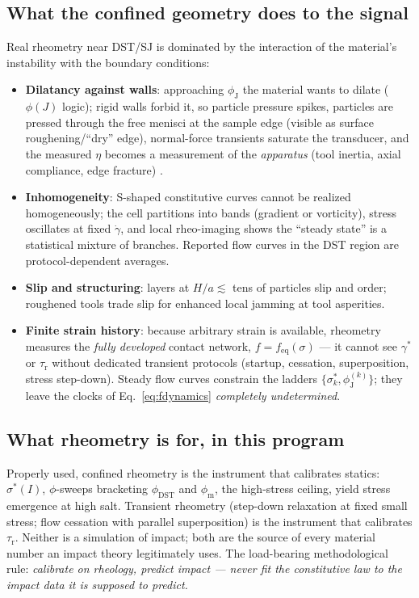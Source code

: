 \documentclass[11pt]{article}
\newcommand{\phiJ}{\phi_{\mathrm{J}}}
\newcommand{\phiM}{\phi_{\mathrm{m}}}
\newcommand{\sigmastar}{\sigma^{*}}
\newcommand{\gdot}{\dot{\gamma}}
\begin{document}
\subsection{What the confined geometry does to the signal}
Real rheometry near DST/SJ is dominated by the interaction of the material's instability with the boundary conditions:
\begin{itemize}
\item \textbf{Dilatancy against walls}: approaching $\phiJ$ the material wants to dilate ($\phi(J)$ logic); rigid walls forbid it, so particle pressure spikes, particles are pressed through the free menisci at the sample edge (visible as surface roughening/``dry'' edge), normal-force transients saturate the transducer, and the measured $\eta$ becomes a measurement of the \emph{apparatus} (tool inertia, axial compliance, edge fracture) \cite{brown2014,hermes2016}.
\item \textbf{Inhomogeneity}: S-shaped constitutive curves cannot be realized homogeneously; the cell partitions into bands (gradient or vorticity), stress oscillates at fixed $\gdot$, and local rheo-imaging shows the ``steady state'' is a statistical mixture of branches. Reported flow curves in the DST region are protocol-dependent averages.
\item \textbf{Slip and structuring}: layers at $H/a \lesssim$ tens of particles slip and order; roughened tools trade slip for enhanced local jamming at tool asperities.
\item \textbf{Finite strain history}: because arbitrary strain is available, rheometry measures the \emph{fully developed} contact network, $f = f_{\mathrm{eq}}(\sigma)$ --- it cannot see $\gamma^{*}$ or $\tau_{\mathrm{r}}$ without dedicated transient protocols (startup, cessation, superposition, stress step-down). Steady flow curves constrain the ladders $\{\sigmastar_k, \phiJ^{(k)}\}$; they leave the clocks of Eq.~\eqref{eq:fdynamics} \emph{completely undetermined}.
\end{itemize}

\subsection{What rheometry is for, in this program}
Properly used, confined rheometry is the instrument that calibrates statics: $\sigmastar(I)$, $\phi$-sweeps bracketing $\phi_{\mathrm{DST}}$ and $\phiM$, the high-stress ceiling, yield stress emergence at high salt. Transient rheometry (step-down relaxation at fixed small stress; flow cessation with parallel superposition) is the instrument that calibrates $\tau_{\mathrm{r}}$. Neither is a simulation of impact; both are the source of every material number an impact theory legitimately uses. The load-bearing methodological rule: \emph{calibrate on rheology, predict impact --- never fit the constitutive law to the impact data it is supposed to predict.}
\end{document}
